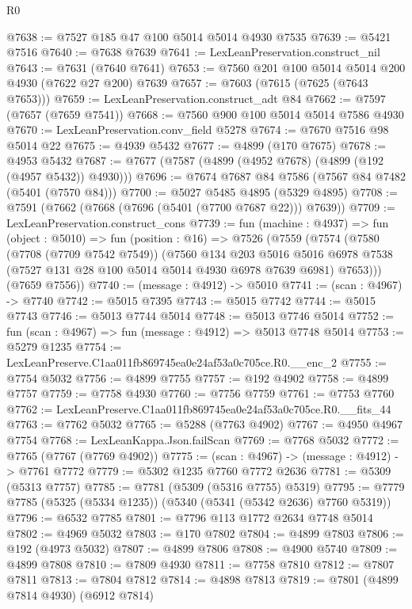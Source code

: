 \begin{lexlean}{R0}
\begin{coremodule}
@7638 := @7527 @185 @47 @100 @5014 @5014 @4930 @7535
@7639 := @5421 @7516
@7640 := @7638 @7639
@7641 := LexLeanPreservation.construct_nil
@7643 := @7631 (@7640 @7641)
@7653 := @7560 @201 @100 @5014 @5014 @200 @4930 (@7622 @27 @200) @7639
@7657 := @7603 (@7615 (@7625 (@7643 @7653)))
@7659 := LexLeanPreservation.construct_adt @84
@7662 := @7597 (@7657 (@7659 @7541))
@7668 := @7560 @900 @100 @5014 @5014 @7586 @4930
@7670 := LexLeanPreservation.conv_field @5278
@7674 := @7670 @7516 @98 @5014 @22
@7675 := @4939 @5432
@7677 := @4899 (@170 @7675)
@7678 := @4953 @5432
@7687 := @7677 (@7587 (@4899 (@4952 @7678) (@4899 (@192 (@4957 @5432)) @4930)))
@7696 := @7674 @7687 @84 @7586 (@7567 @84 @7482 (@5401 (@7570 @84)))
@7700 := @5027 @5485 @4895 (@5329 @4895)
@7708 := @7591 (@7662 (@7668 (@7696 (@5401 (@7700 @7687 @22))) @7639))
@7709 := LexLeanPreservation.construct_cons
@7739 := fun (machine : @4937) =>
  fun (object : @5010) =>
  fun (position : @16) =>
  @7526
    (@7559
      (@7574
        (@7580
          (@7708 (@7709 @7542 @7549))
          (@7560
            @134
            @203
            @5016
            @5016
            @6978
            @7538
            (@7527 @131 @28 @100 @5014 @5014 @4930 @6978 @7639 @6981)
            @7653)))
      (@7659 @7556))
@7740 := (message : @4912) -> @5010
@7741 := (scan : @4967) -> @7740
@7742 := @5015 @7395
@7743 := @5015 @7742
@7744 := @5015 @7743
@7746 := @5013 @7744 @5014
@7748 := @5013 @7746 @5014
@7752 := fun (scan : @4967) => fun (message : @4912) => @5013 @7748 @5014
@7753 := @5279 @1235
@7754 := LexLeanPreserve.C1aa011fb869745ea0e24af53a0c705ce.R0.__enc_2
@7755 := @7754 @5032
@7756 := @4899 @7755
@7757 := @192 @4902
@7758 := @4899 @7757
@7759 := @7758 @4930
@7760 := @7756 @7759
@7761 := @7753 @7760
@7762 := LexLeanPreserve.C1aa011fb869745ea0e24af53a0c705ce.R0.__fits_44
@7763 := @7762 @5032
@7765 := @5288 (@7763 @4902)
@7767 := @4950 @4967 @7754
@7768 := LexLeanKappa.Json.failScan
@7769 := @7768 @5032
@7772 := @7765 (@7767 (@7769 @4902))
@7775 := (scan : @4967) -> (message : @4912) -> @7761 @7772
@7779 := @5302 @1235 @7760 @7772 @2636
@7781 := @5309 (@5313 @7757)
@7785 := @7781 (@5309 (@5316 @7755) @5319)
@7795 := @7779 @7785 (@5325 (@5334 @1235)) (@5340 (@5341 (@5342 @2636) @7760 @5319))
@7796 := @6532 @7785
@7801 := @7796 @113 @1772 @2634 @7748 @5014
@7802 := @4969 @5032
@7803 := @170 @7802
@7804 := @4899 @7803
@7806 := @192 (@4973 @5032)
@7807 := @4899 @7806
@7808 := @4900 @5740
@7809 := @4899 @7808
@7810 := @7809 @4930
@7811 := @7758 @7810
@7812 := @7807 @7811
@7813 := @7804 @7812
@7814 := @4898 @7813
@7819 := @7801 (@4899 @7814 @4930) (@6912 @7814)

\end{coremodule}
\end{lexlean}
